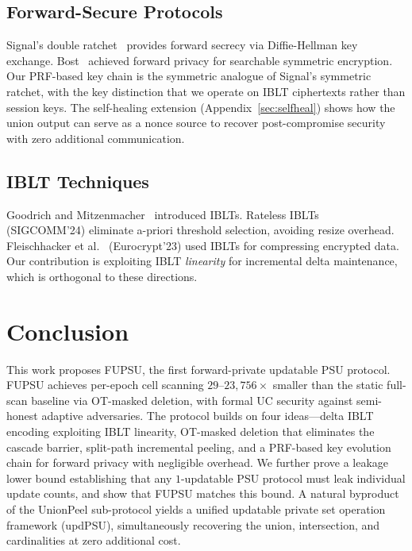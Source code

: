 \subsection{Forward-Secure Protocols}
 Signal's double
ratchet~\cite{Signal} provides forward secrecy via Diffie-Hellman key exchange.
Bost~\cite{Bos16} achieved forward privacy for searchable symmetric encryption.
Our PRF-based key chain is the symmetric analogue of Signal's symmetric ratchet,
with the key distinction that we operate on IBLT ciphertexts rather than session
keys. The self-healing extension (Appendix~\ref{sec:selfheal}) shows how the
union output can serve as a nonce source to recover post-compromise security
with zero additional communication.

\subsection{IBLT Techniques}
 Goodrich and Mitzenmacher~\cite{GM11} introduced
IBLTs. Rateless IBLTs~\cite{YGA24} (SIGCOMM'24) eliminate a-priori threshold
selection, avoiding resize overhead. Fleischhacker et al.~\cite{FLS23}
(Eurocrypt'23) used IBLTs for compressing encrypted data. Our contribution is
exploiting IBLT \emph{linearity} for incremental delta maintenance, which is
orthogonal to these directions.

\section{Conclusion}

This work proposes FUPSU, the first forward-private updatable PSU protocol.
FUPSU achieves per-epoch cell scanning $29$--$23{,}756\times$ smaller than the
static full-scan baseline via OT-masked deletion, with formal UC security against
semi-honest adaptive adversaries. The protocol builds on four ideas---delta IBLT
encoding exploiting IBLT linearity, OT-masked deletion that eliminates the
cascade barrier, split-path incremental peeling, and a PRF-based key evolution
chain for forward privacy with negligible overhead. We further prove a leakage lower
bound establishing that any $1$-updatable PSU protocol must leak individual
update counts, and show that FUPSU matches this bound. A natural byproduct
of the UnionPeel sub-protocol yields a unified updatable private set
operation framework (updPSU), simultaneously recovering the union,
intersection, and cardinalities at zero additional cost.

